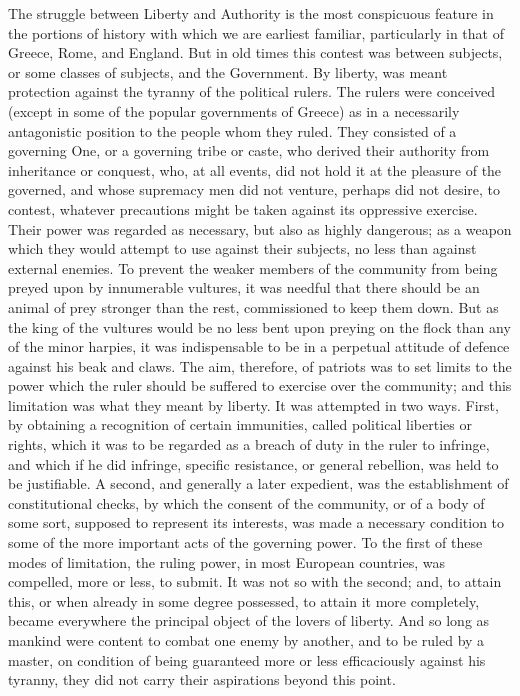 \documentclass[11pt,openany]{book}
\begin{document}
The struggle between Liberty and Authority is the most conspicuous feature in the portions of history with which we are earliest familiar, particularly in that of Greece, Rome, and England. But in old times this contest was between subjects, or some classes of subjects, and the Government. By liberty, was meant protection against the tyranny of the political rulers. The rulers were conceived (except in some of the popular governments of Greece) as in a necessarily antagonistic position to the people whom they ruled. They consisted of a governing One, or a governing tribe or caste, who derived their authority from inheritance or conquest, who, at all events, did not hold it at the pleasure of the governed, and whose supremacy men did not venture, perhaps did not desire, to contest, whatever precautions might be taken against its oppressive exercise. Their power was regarded as necessary, but also as highly dangerous; as a weapon which they would attempt to use against their subjects, no less than against external enemies. To prevent the weaker members of the community from being preyed upon by innumerable vultures, it was needful that there should be an animal of prey stronger than the rest, commissioned to keep them down. But as the king of the vultures would be no less bent upon preying on the flock than any of the minor harpies, it was indispensable to be in a perpetual attitude of defence against his beak and claws. The aim, therefore, of patriots was to set limits to the power which the ruler should be suffered to exercise over the community; and this limitation was what they meant by liberty. It was attempted in two ways. First, by obtaining a recognition of certain immunities, called political liberties or rights, which it was to be regarded as a breach of duty in the ruler to infringe, and which if he did infringe, specific resistance, or general rebellion, was held to be justifiable. A second, and generally a later expedient, was the establishment of constitutional checks, by which the consent of the community, or of a body of some sort, supposed to represent its interests, was made a necessary condition to some of the more important acts of the governing power. To the first of these modes of limitation, the ruling power, in most European countries, was compelled, more or less, to submit. It was not so with the second; and, to attain this, or when already in some degree possessed, to attain it more completely, became everywhere the principal object of the lovers of liberty. And so long as mankind were content to combat one enemy by another, and to be ruled by a master, on condition of being guaranteed more or less efficaciously against his tyranny, they did not carry their aspirations beyond this point.
\end{document}
